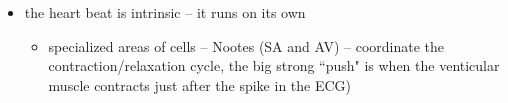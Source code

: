 \documentclass{article}
\theoremstyle{definition}
\begin{document}
\begin{itemize}
\begin{center}
		\end{center}
	\item the heart beat is intrinsic -- it runs on its own
		\begin{itemize}
			\item specialized areas of cells  -- Nootes (SA and AV) -- coordinate the contraction/relaxation cycle, the big strong ``push" is when the venticular muscle contracts just after the spike in the ECG)
		\end{itemize}
\end{itemize}
\end{document}

